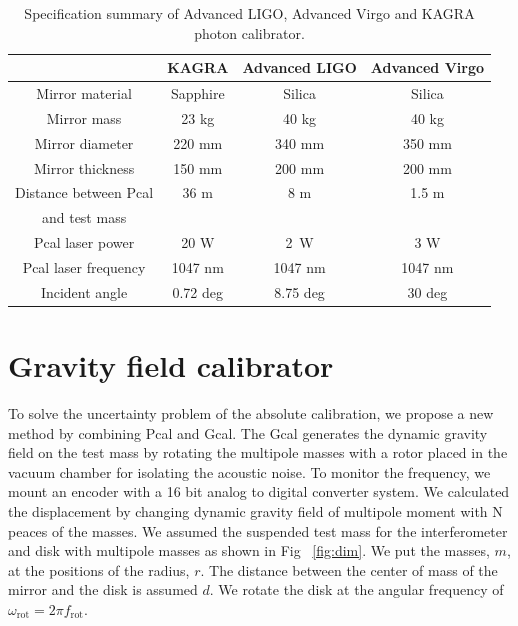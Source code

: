 \documentclass[A4]{spie}  %
\begin{document}
\begin{table}
\begin{center}
\caption{Specification summary of Advanced LIGO, Advanced Virgo and KAGRA photon calibrator. \label{pcal}}
\footnotesize
\begin{tabular}{cccc}
\hline
& KAGRA& Advanced LIGO& Advanced Virgo \\
\hline
Mirror material & Sapphire & Silica & Silica \\
 Mirror mass & 23 kg & 40 kg & 40 kg \\
  Mirror diameter & 220 mm & 340 mm & 350 mm \\
    Mirror thickness & 150 mm & 200 mm & 200 mm \\
 Distance between Pcal & 36 m & 8 m & 1.5 m \\
and test mass &&& \\
  Pcal laser power & 20 W & 2~W & 3 W \\
  Pcal laser frequency & 1047 nm & 1047 nm &1047 nm\\
  Incident angle& 0.72 deg & 8.75 deg &30 deg \\
  \hline
\end{tabular}
\end{center}
\end{table}

\section{Gravity field calibrator} \label{sec:Gcal}
To solve the uncertainty problem of the absolute calibration, we propose a new method by combining Pcal and Gcal. %
 The Gcal generates the dynamic gravity field on %
the test mass by rotating the multipole masses with a rotor placed in the vacuum chamber for isolating the acoustic noise. To monitor the frequency, we mount an %
encoder with %
a 16 bit analog to digital converter  system.
We calculated the displacement by changing dynamic gravity field of multipole moment with N peaces of the masses.
We assumed the suspended test mass for the interferometer and disk with multipole masses as shown in Fig ~\ref{fig:dim}.
We put the masses, $m$, at the positions of the radius, $r$. The distance between the center of mass of the mirror and the disk is assumed $d$.
We rotate the disk at the angular frequency of $\omega_{\mathrm{rot}}=2\pi f_{\mathrm{rot}}$.
\end{document}
